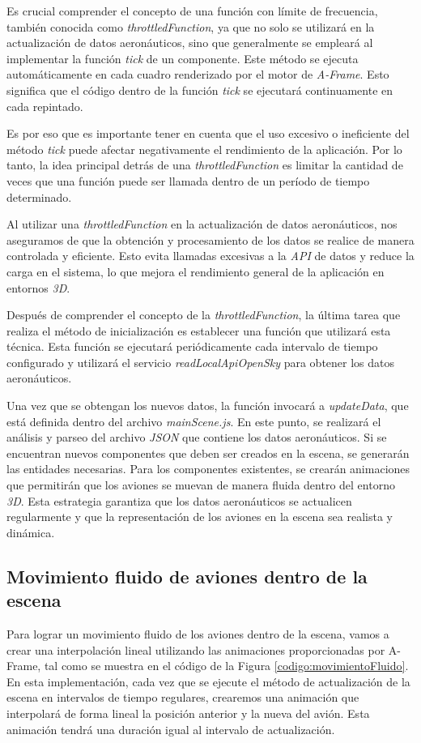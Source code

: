 \documentclass[a4paper, 11pt]{book}
\begin{document}
Es crucial comprender el concepto de una función con límite de frecuencia, también conocida como \emph{throttledFunction}, ya que no solo se utilizará en la actualización de datos aeronáuticos, sino que generalmente se empleará al implementar la función \emph{tick} de un componente. Este método se ejecuta automáticamente en cada cuadro renderizado por el motor de \emph{A-Frame}. Esto significa que el código dentro de la función \emph{tick} se ejecutará continuamente en cada repintado.

Es por eso que es importante tener en cuenta que el uso excesivo o ineficiente del método \emph{tick} puede afectar negativamente el rendimiento de la aplicación. Por lo tanto, la idea principal detrás de una \emph{throttledFunction} es limitar la cantidad de veces que una función puede ser llamada dentro de un período de tiempo determinado.

Al utilizar una \emph{throttledFunction} en la actualización de datos aeronáuticos, nos aseguramos de que la obtención y procesamiento de los datos se realice de manera controlada y eficiente. Esto evita llamadas excesivas a la \emph{API} de datos y reduce la carga en el sistema, lo que mejora el rendimiento general de la aplicación en entornos \emph{3D}.

Después de comprender el concepto de la \emph{throttledFunction}, la última tarea que realiza el método de inicialización es establecer una función que utilizará esta técnica. Esta función se ejecutará periódicamente cada intervalo de tiempo configurado y utilizará el servicio \emph{readLocalApiOpenSky} para obtener los datos aeronáuticos.

Una vez que se obtengan los nuevos datos, la función invocará a \emph{updateData}, que está definida dentro del archivo \emph{mainScene.js}. En este punto, se realizará el análisis y parseo del archivo \emph{JSON} que contiene los datos aeronáuticos. Si se encuentran nuevos componentes que deben ser creados en la escena, se generarán las entidades necesarias. Para los componentes existentes, se crearán animaciones que permitirán que los aviones se muevan de manera fluida dentro del entorno \emph{3D}.
Esta estrategia garantiza que los datos aeronáuticos se actualicen regularmente y que la representación de los aviones en la escena sea realista y dinámica.

\subsection{Movimiento fluido de aviones dentro de la escena}
\label{subsec:movimientoFluido}
Para lograr un movimiento fluido de los aviones dentro de la escena, vamos a crear una interpolación lineal utilizando las animaciones proporcionadas por A-Frame, tal como se muestra en el código de la Figura \ref{codigo:movimientoFluido}. En esta implementación, cada vez que se ejecute el método de actualización de la escena en intervalos de tiempo regulares, crearemos una animación que interpolará de forma lineal la posición anterior y la nueva del avión. Esta animación tendrá una duración igual al intervalo de actualización.
\end{document}

